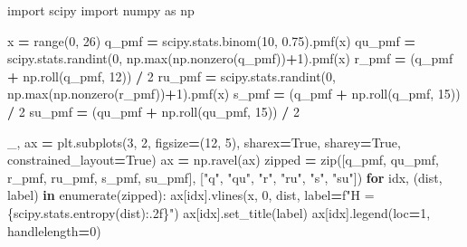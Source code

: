 \documentclass[
  11pt,
]{krantz}
\makeatletter
\newenvironment{Shaded}{\begin{snugshade}}{\end{snugshade}}
\newcommand{\BuiltInTok}[1]{#1}
\newcommand{\ControlFlowTok}[1]{\textcolor[rgb]{0.27,0.27,0.27}{\textbf{#1}}}
\newcommand{\DecValTok}[1]{\textcolor[rgb]{0.06,0.06,0.06}{#1}}
\newcommand{\FloatTok}[1]{\textcolor[rgb]{0.06,0.06,0.06}{#1}}
\newcommand{\ImportTok}[1]{#1}
\newcommand{\KeywordTok}[1]{\textcolor[rgb]{0.27,0.27,0.27}{\textbf{#1}}}
\newcommand{\NormalTok}[1]{#1}
\newcommand{\OperatorTok}[1]{\textcolor[rgb]{0.43,0.43,0.43}{\textbf{#1}}}
\newcommand{\SpecialCharTok}[1]{\textcolor[rgb]{0,0,0}{#1}}
\newcommand{\SpecialStringTok}[1]{\textcolor[rgb]{0.5,0.5,0.5}{#1}}
\newcommand{\StringTok}[1]{\textcolor[rgb]{0.5,0.5,0.5}{#1}}
\newcommand{\VariableTok}[1]{\textcolor[rgb]{0,0,0}{#1}}
\newenvironment{kframe}{%
\medskip{}
\setlength{\fboxsep}{.8em}
 \def\at@end@of@kframe{}%
 \ifinner\ifhmode%
  \def\at@end@of@kframe{\end{minipage}}%
  \begin{minipage}{\columnwidth}%
 \fi\fi%
 \def\FrameCommand##1{\hskip\@totalleftmargin \hskip-\fboxsep
 \colorbox{shadecolor}{##1}\hskip-\fboxsep
     \hskip-\linewidth \hskip-\@totalleftmargin \hskip\columnwidth}%
 \MakeFramed {\advance\hsize-\width
   \@totalleftmargin\z@ \linewidth\hsize
   \@setminipage}}%
 {\par\unskip\endMakeFramed%
 \at@end@of@kframe}
\renewenvironment{Shaded}{\begin{kframe}}{\end{kframe}}
\theoremstyle{definition}
\theoremstyle{definition}
\theoremstyle{definition}
\theoremstyle{definition}
\theoremstyle{remark}
\makeatother
\begin{document}
\begin{Shaded}
\begin{Highlighting}[]
\ImportTok{import}\NormalTok{ scipy}
\ImportTok{import}\NormalTok{ numpy }\ImportTok{as}\NormalTok{ np}

\NormalTok{x }\OperatorTok{=} \BuiltInTok{range}\NormalTok{(}\DecValTok{0}\NormalTok{, }\DecValTok{26}\NormalTok{)}
\NormalTok{q\_pmf }\OperatorTok{=}\NormalTok{ scipy.stats.binom(}\DecValTok{10}\NormalTok{, }\FloatTok{0.75}\NormalTok{).pmf(x)}
\NormalTok{qu\_pmf }\OperatorTok{=}\NormalTok{ scipy.stats.randint(}\DecValTok{0}\NormalTok{, np.}\BuiltInTok{max}\NormalTok{(np.nonzero(q\_pmf))}\OperatorTok{+}\DecValTok{1}\NormalTok{).pmf(x) }
\NormalTok{r\_pmf }\OperatorTok{=}\NormalTok{ (q\_pmf }\OperatorTok{+}\NormalTok{ np.roll(q\_pmf, }\DecValTok{12}\NormalTok{)) }\OperatorTok{/} \DecValTok{2}
\NormalTok{ru\_pmf }\OperatorTok{=}\NormalTok{ scipy.stats.randint(}\DecValTok{0}\NormalTok{, np.}\BuiltInTok{max}\NormalTok{(np.nonzero(r\_pmf))}\OperatorTok{+}\DecValTok{1}\NormalTok{).pmf(x) }
\NormalTok{s\_pmf }\OperatorTok{=}\NormalTok{ (q\_pmf }\OperatorTok{+}\NormalTok{ np.roll(q\_pmf, }\DecValTok{15}\NormalTok{)) }\OperatorTok{/} \DecValTok{2}
\NormalTok{su\_pmf }\OperatorTok{=}\NormalTok{ (qu\_pmf }\OperatorTok{+}\NormalTok{ np.roll(qu\_pmf, }\DecValTok{15}\NormalTok{)) }\OperatorTok{/} \DecValTok{2}

\NormalTok{\_, ax }\OperatorTok{=}\NormalTok{ plt.subplots(}\DecValTok{3}\NormalTok{, }\DecValTok{2}\NormalTok{, figsize}\OperatorTok{=}\NormalTok{(}\DecValTok{12}\NormalTok{, }\DecValTok{5}\NormalTok{), sharex}\OperatorTok{=}\VariableTok{True}\NormalTok{, sharey}\OperatorTok{=}\VariableTok{True}\NormalTok{,}
\NormalTok{  constrained\_layout}\OperatorTok{=}\VariableTok{True}\NormalTok{)}
\NormalTok{ax }\OperatorTok{=}\NormalTok{ np.ravel(ax)}
\NormalTok{zipped }\OperatorTok{=} \BuiltInTok{zip}\NormalTok{([q\_pmf, qu\_pmf, r\_pmf, ru\_pmf, s\_pmf, su\_pmf], }
\NormalTok{  [}\StringTok{"q"}\NormalTok{, }\StringTok{"qu"}\NormalTok{, }\StringTok{"r"}\NormalTok{, }\StringTok{"ru"}\NormalTok{, }\StringTok{"s"}\NormalTok{, }\StringTok{"su"}\NormalTok{])}
\ControlFlowTok{for}\NormalTok{ idx, (dist, label) }\KeywordTok{in} \BuiltInTok{enumerate}\NormalTok{(zipped):}
\NormalTok{    ax[idx].vlines(x, }\DecValTok{0}\NormalTok{, dist, label}\OperatorTok{=}\SpecialStringTok{f"H = }\SpecialCharTok{\{}\NormalTok{scipy}\SpecialCharTok{.}\NormalTok{stats}\SpecialCharTok{.}\NormalTok{entropy(dist)}\SpecialCharTok{:.2f\}}\SpecialStringTok{"}\NormalTok{) }
\NormalTok{    ax[idx].set\_title(label)}
\NormalTok{    ax[idx].legend(loc}\OperatorTok{=}\DecValTok{1}\NormalTok{, handlelength}\OperatorTok{=}\DecValTok{0}\NormalTok{)}
\end{Highlighting}
\end{Shaded}
\end{document}
